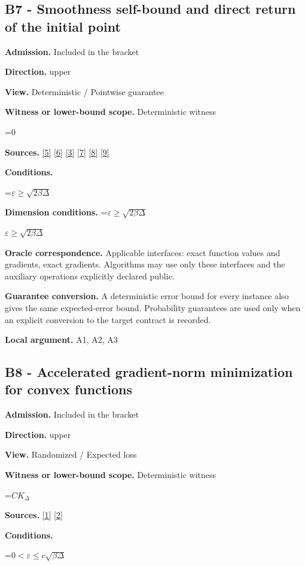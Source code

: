 \documentclass[10pt,a4paper]{article}
\newcommand{\AtlasMath}[1]{\par\begingroup\centering\setbox0=\hbox{$\displaystyle #1$}\ifdim\wd0>1.4\linewidth\typeout{ATLAS WIDE FORMULA: \the\wd0}\fi\ifdim\wd0>\linewidth\resizebox{\linewidth}{!}{\box0}\else\box0\fi\par\endgroup}
\newcommand{\AtlasInlineMath}[1]{\begingroup\setbox0=\hbox{$#1$}\ifdim\wd0>.4\linewidth\endgroup\AtlasMath{#1}\else\endgroup$#1$\fi}
\begin{document}
\subsection{B7 - Smoothness self-bound and direct return of the initial point}
\textbf{Admission.} Included in the bracket

\textbf{Direction.} upper

\textbf{View.} Deterministic / Pointwise guarantee

\textbf{Witness or lower-bound scope.} Deterministic witness

\AtlasMath{0}
\textbf{Sources.} \href{https://arxiv.org/pdf/2101.09740v2}{[5]} \href{https://arxiv.org/pdf/2609.33360v2}{[6]} \href{https://arxiv.org/pdf/2609.10874}{[3]} \href{https://arxiv.org/pdf/1405.4980}{[7]} \href{https://www2.isye.gatech.edu/~nemirovs/MOR_AccuracyCertificates.pdf}{[8]} \href{https://arxiv.org/pdf/2609.20701}{[9]}

\textbf{Conditions.} 
\AtlasMath{\varepsilon\ge\sqrt{2\beta\Delta}}


\textbf{Dimension conditions.} \AtlasInlineMath{\varepsilon\ge\sqrt{2\beta\Delta}}

\textbf{Oracle correspondence.} Applicable interfaces: exact function values and gradients, exact gradients. Algorithms may use only these interfaces and the auxiliary operations explicitly declared public.

\textbf{Guarantee conversion.} A deterministic error bound for every instance also gives the same expected-error bound. Probability guarantees are used only when an explicit conversion to the target contract is recorded.

\textbf{Local argument.} A1, A2, A3

\subsection{B8 - Accelerated gradient-norm minimization for convex functions}
\textbf{Admission.} Included in the bracket

\textbf{Direction.} upper

\textbf{View.} Randomized / Expected loss

\textbf{Witness or lower-bound scope.} Deterministic witness

\AtlasMath{CK_\Delta}
\textbf{Sources.} \href{https://arxiv.org/pdf/1803.06600v4}{[1]} \href{https://doi.org/10.1007/s10107-026-02352-2}{[2]}

\textbf{Conditions.} 
\AtlasMath{0<\varepsilon\le c\sqrt{\beta\Delta}}
\end{document}
